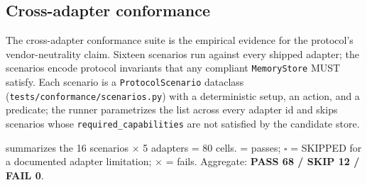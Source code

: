 \documentclass[11pt,letterpaper,twocolumn]{article}
\begin{document}
\subsection{Cross-adapter conformance}
\label{sec:eval-conformance}

The cross-adapter conformance suite is the empirical evidence for the protocol's vendor-neutrality claim. Sixteen scenarios run against every shipped adapter; the scenarios encode protocol invariants that any compliant \texttt{MemoryStore} MUST satisfy. Each scenario is a \texttt{ProtocolScenario} dataclass (\texttt{tests/conformance/scenarios.py}) with a deterministic setup, an action, and a predicate; the runner parametrizes the list across every adapter id and skips scenarios whose \texttt{required\_capabilities} are not satisfied by the candidate store.

 summarizes the 16 scenarios $\times$ 5 adapters = 80 cells. \checkmark = passes; $\square$ = SKIPPED for a documented adapter limitation; $\times$ = fails. Aggregate: \textbf{PASS 68 / SKIP 12 / FAIL 0}.
\end{document}
